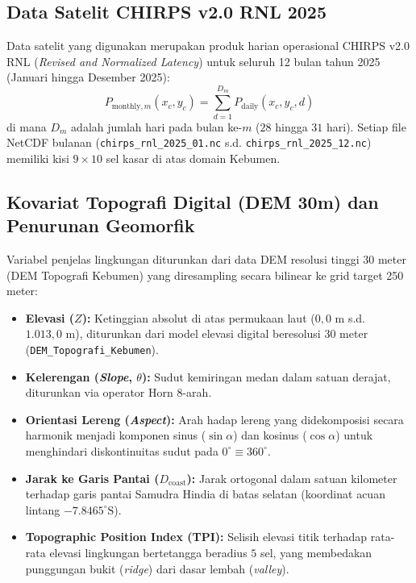 \documentclass[11pt,a4paper]{article}
\begin{document}
\subsection{Data Satelit CHIRPS v2.0 RNL 2025}
Data satelit yang digunakan merupakan produk harian operasional CHIRPS v2.0 RNL (\textit{Revised and Normalized Latency}) untuk seluruh 12 bulan tahun 2025 (Januari hingga Desember 2025):
\begin{equation}
    P_{\text{monthly}, m}(x_c, y_c) = \sum_{d=1}^{D_m} P_{\text{daily}}(x_c, y_c, d)
\end{equation}
di mana $D_m$ adalah jumlah hari pada bulan ke-$m$ ($28$ hingga $31$ hari). Setiap file NetCDF bulanan (\texttt{chirps\_rnl\_2025\_01.nc} s.d. \texttt{chirps\_rnl\_2025\_12.nc}) memiliki kisi $9 \times 10$ sel kasar di atas domain Kebumen.

\subsection{Kovariat Topografi Digital (DEM 30m) dan Penurunan Geomorfik}
Variabel penjelas lingkungan diturunkan dari data DEM resolusi tinggi 30 meter (DEM Topografi Kebumen) yang diresampling secara bilinear ke grid target 250 meter:
\begin{itemize}
    \item \textbf{Elevasi ($Z$):} Ketinggian absolut di atas permukaan laut ($0,0\text{ m}$ s.d. $1.013,0\text{ m}$), diturunkan dari model elevasi digital beresolusi 30 meter (\texttt{DEM\_Topografi\_Kebumen}).
    \item \textbf{Kelerengan (\textit{Slope}, $\theta$):} Sudut kemiringan medan dalam satuan derajat, diturunkan via operator Horn 8-arah.
    \item \textbf{Orientasi Lereng (\textit{Aspect}):} Arah hadap lereng yang didekomposisi secara harmonik menjadi komponen sinus ($\sin \alpha$) dan kosinus ($\cos \alpha$) untuk menghindari diskontinuitas sudut pada $0^\circ \equiv 360^\circ$.
    \item \textbf{Jarak ke Garis Pantai ($D_{\text{coast}}$):} Jarak ortogonal dalam satuan kilometer terhadap garis pantai Samudra Hindia di batas selatan (koordinat acuan lintang $-7.8465^\circ\text{S}$).
    \item \textbf{Topographic Position Index (TPI):} Selisih elevasi titik terhadap rata-rata elevasi lingkungan bertetangga beradius $5$ sel, yang membedakan punggungan bukit (\textit{ridge}) dari dasar lembah (\textit{valley}).
\end{itemize}
\end{document}
